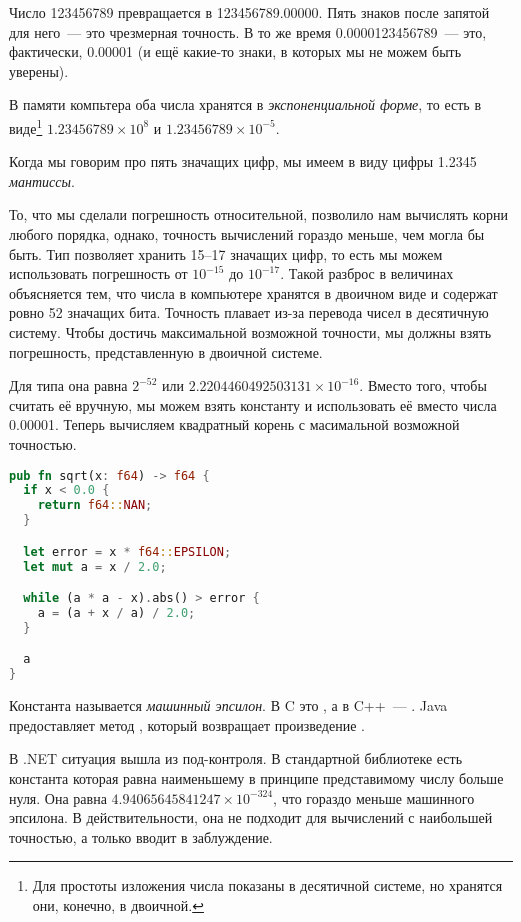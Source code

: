 Число 123456789 превращается в 123456789.00000.
Пять знаков после запятой для него~--- это чрезмерная точность.
В то же время 0.0000123456789~--- это, фактически, 0.00001 (и ещё какие-то знаки, в которых мы не можем быть уверены).

В памяти компьтера оба числа хранятся в {\em экспоненциальной форме}, то есть в виде\footnote{
  Для простоты изложения числа показаны в десятичной системе, но хранятся они, конечно, в двоичной.
} $1.23456789\times 10^8$ и $1.23456789\times 10^{-5}$.

Когда мы говорим про пять значащих цифр, мы имеем в виду цифры 1.2345 {\em мантиссы}.

То, что мы сделали погрешность относительной, позволило нам вычислять корни любого порядка, однако, точность вычислений гораздо меньше, чем могла бы быть.
Тип  позволяет хранить 15–17 значащих цифр, то есть мы можем использовать погрешность от $10^{-15}$ до $10^{-17}$.
Такой разброс в величинах объясняется тем, что числа в компьютере хранятся в двоичном виде и содержат ровно 52 значащих бита.
Точность плавает из-за перевода чисел в десятичную систему.
Чтобы достичь максимальной возможной точности, мы должны взять погрешность, представленную в двоичной системе.

Для типа  она равна $2^{-52}$ или $2.2204460492503131\times 10^{-16}$.
Вместо того, чтобы считать её вручную, мы можем взять константу  и использовать её вместо числа 0.00001.
Теперь вычисляем квадратный корень с масимальной возможной точностью.

\begin{lstlisting}[language=Rust]
pub fn sqrt(x: f64) -> f64 {
  if x < 0.0 {
    return f64::NAN;
  }

  let error = x * f64::EPSILON;
  let mut a = x / 2.0;

  while (a * a - x).abs() > error {
    a = (a + x / a) / 2.0;
  }

  a
}
\end{lstlisting}

Константа  называется {\em машинный эпсилон}.
В C это , а в C++~--- .
Java предоставляет метод , который возвращает произведение .

В .NET ситуация вышла из под-контроля.
В стандартной библиотеке есть константа  которая равна наименьшему в принципе представимому числу больше нуля.
Она равна $4.94065645841247\times 10^{-324}$, что гораздо меньше машинного эпсилона.
В действительности, она не подходит для вычислений с наибольшей точностью, а только вводит в заблуждение.

